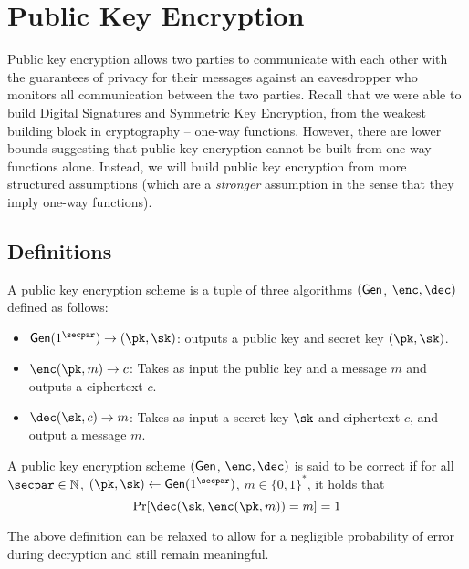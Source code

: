 \chapter{Public Key Encryption}
Public key encryption allows two parties
to communicate with each other with the guarantees of privacy for their messages against an eavesdropper who monitors all communication between the two parties. Recall that we were able to build Digital Signatures and Symmetric Key Encryption, from the weakest building block in cryptography -- one-way functions. However, there are lower bounds
suggesting that public key encryption cannot be built from one-way functions alone. Instead, we will build public key encryption from more structured assumptions (which are a \emph{stronger} assumption in the sense that they imply one-way functions).

\section{Definitions}
\begin{definition}
    A public key encryption scheme is a tuple of three algorithms $(\mathsf{Gen}$, $\enc, \dec)$ defined as follows:
    \begin{itemize}
        \item $\gen(1^\secpar) \to (\pk, \sk)$: outputs a public key and secret key $(\pk, \sk)$.

        \item $\enc(\pk, m) \to c$: Takes as input the public key and a message $m$ and outputs a ciphertext $c$.

        \item $\dec(\sk, c) \to m$: Takes as input a secret key $\sk$ and ciphertext $c$, and output a message $m$.
    \end{itemize}
\end{definition}

\begin{definition}
    A public key encryption scheme $(\mathsf{Gen}$, $\enc, \dec)$ is said to be correct if for all $\secpar \in \mathbb{N}$, $(\pk, \sk) \gets \gen(1^\secpar)$, $m \in \{0,1\}^*$, it holds that
    \[\Pr[\dec(\sk, \enc(\pk, m)) = m] = 1\]
\end{definition}
The above definition can be relaxed to allow for a negligible probability of error during decryption and still remain meaningful.

